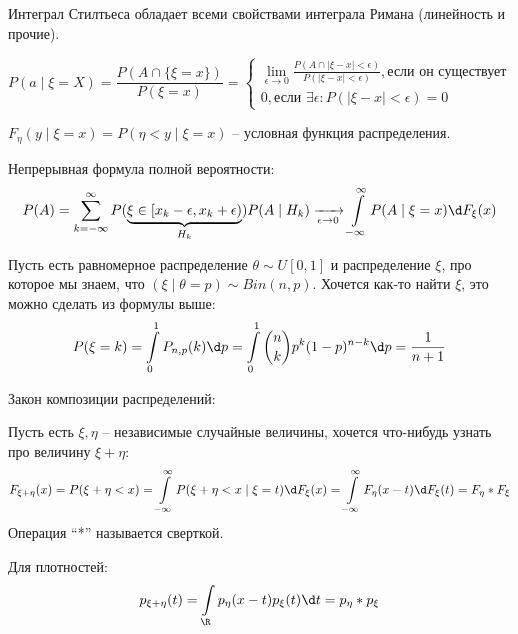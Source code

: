 Интеграл Стилтьеса обладает всеми свойствами интеграла Римана (линейность и прочие).

\begin{Def}
$$P(a \mid \xi = X) = \frac{P(A \cap \{\xi = x\})}{P(\xi = x)} = \begin{cases} \lim\limits_{\epsilon \to 0}  \frac{P(A \cap |\xi - x| < \epsilon)}{P(|\xi - x| < \epsilon)}, \text{если он существует} \\
0, \text{если } \exists \epsilon \colon P(|\xi - x| < \epsilon) = 0 \end{cases}$$
\end{Def}

\begin{Def}
    $F_{\eta}(y \mid \xi = x) = P(\eta < y \mid \xi = x)$ -- условная функция распределения.    
\end{Def}

Непрерывная формула полной вероятности:
$$P(A) = \sum\limits_{k=-\infty}^{\infty} P(\underbrace{\xi \in [x_k - \epsilon, x_k + \epsilon)}_{H_k}) P(A \mid H_k) \xrightarrow[\epsilon \to 0]{} \int\limits_{-\infty}^{\infty} P(A \mid \xi = x) \d F_{\xi}(x)$$

\begin{exmp}
Пусть есть равномерное распределение $\theta \sim U[0, 1]$ и распределение $\xi$, про которое мы знаем, что $(\xi \mid \theta = p) \sim Bin(n, p)$. 
Хочется как-то найти $\xi$, это можно сделать из формулы выше:
$$P(\xi = k) = \int\limits_0^1 P_{n, p}(k) \d p = \int\limits_0^1 {n \choose k} p^k (1 - p)^{n-k} \d p = \frac{1}{n + 1}$$
\end{exmp}

Закон композиции распределений:

Пусть есть $\xi, \eta$ -- независимые случайные величины, хочется что-нибудь узнать про величину $\xi + \eta$:
$$F_{\xi + \eta}(x) = P(\xi + \eta < x) = \int\limits_{-\infty}^{\infty} P(\xi + \eta < x \mid \xi = t) \d F_{\xi}(x) = \int\limits_{-\infty}^{\infty} F_{\eta}(x - t) \d F_{\xi}(t) = F_{\eta} * F_{\xi}$$
Операция ``*'' называется сверткой. 

Для плотностей:
$$p_{\xi + \eta}(t) = \int\limits_{\R} p_{\eta}(x - t) p_{\xi}(t) \d t = p_{\eta} * p_{\xi}$$
